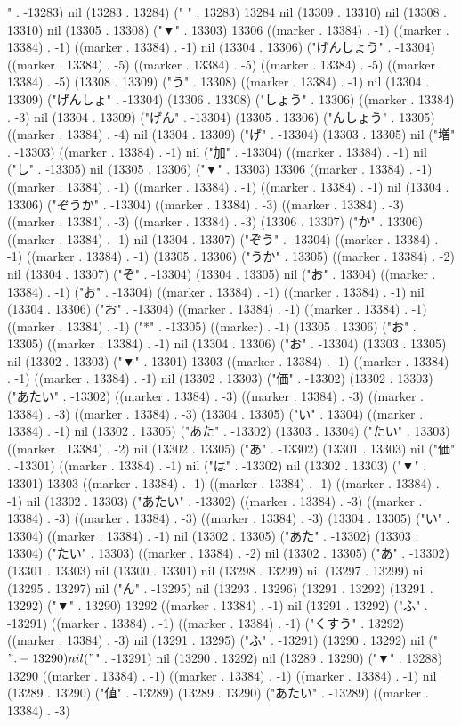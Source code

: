 " . -13283) nil (13283 . 13284) (" " . 13283) 13284 nil (13309 . 13310) nil (13308 . 13310) nil (13305 . 13308) ("▼" . 13303) 13306 ((marker . 13384) . -1) ((marker . 13384) . -1) ((marker . 13384) . -1) nil (13304 . 13306) ("げんしょう" . -13304) ((marker . 13384) . -5) ((marker . 13384) . -5) ((marker . 13384) . -5) ((marker . 13384) . -5) (13308 . 13309) ("う" . 13308) ((marker . 13384) . -1) nil (13304 . 13309) ("げんしょ" . -13304) (13306 . 13308) ("しょう" . 13306) ((marker . 13384) . -3) nil (13304 . 13309) ("げん" . -13304) (13305 . 13306) ("んしょう" . 13305) ((marker . 13384) . -4) nil (13304 . 13309) ("げ" . -13304) (13303 . 13305) nil ("増" . -13303) ((marker . 13384) . -1) nil ("加" . -13304) ((marker . 13384) . -1) nil ("し" . -13305) nil (13305 . 13306) ("▼" . 13303) 13306 ((marker . 13384) . -1) ((marker . 13384) . -1) ((marker . 13384) . -1) ((marker . 13384) . -1) nil (13304 . 13306) ("ぞうか" . -13304) ((marker . 13384) . -3) ((marker . 13384) . -3) ((marker . 13384) . -3) ((marker . 13384) . -3) (13306 . 13307) ("か" . 13306) ((marker . 13384) . -1) nil (13304 . 13307) ("ぞう" . -13304) ((marker . 13384) . -1) ((marker . 13384) . -1) (13305 . 13306) ("うか" . 13305) ((marker . 13384) . -2) nil (13304 . 13307) ("ぞ" . -13304) (13304 . 13305) nil ("お" . 13304) ((marker . 13384) . -1) ("お" . -13304) ((marker . 13384) . -1) ((marker . 13384) . -1) nil (13304 . 13306) ("お" . -13304) ((marker . 13384) . -1) ((marker . 13384) . -1) ((marker . 13384) . -1) ("*" . -13305) ((marker) . -1) (13305 . 13306) ("お" . 13305) ((marker . 13384) . -1) nil (13304 . 13306) ("お" . -13304) (13303 . 13305) nil (13302 . 13303) ("▼" . 13301) 13303 ((marker . 13384) . -1) ((marker . 13384) . -1) ((marker . 13384) . -1) nil (13302 . 13303) ("価" . -13302) (13302 . 13303) ("あたい" . -13302) ((marker . 13384) . -3) ((marker . 13384) . -3) ((marker . 13384) . -3) ((marker . 13384) . -3) (13304 . 13305) ("い" . 13304) ((marker . 13384) . -1) nil (13302 . 13305) ("あた" . -13302) (13303 . 13304) ("たい" . 13303) ((marker . 13384) . -2) nil (13302 . 13305) ("あ" . -13302) (13301 . 13303) nil ("価" . -13301) ((marker . 13384) . -1) nil ("は" . -13302) nil (13302 . 13303) ("▼" . 13301) 13303 ((marker . 13384) . -1) ((marker . 13384) . -1) ((marker . 13384) . -1) nil (13302 . 13303) ("あたい" . -13302) ((marker . 13384) . -3) ((marker . 13384) . -3) ((marker . 13384) . -3) ((marker . 13384) . -3) (13304 . 13305) ("い" . 13304) ((marker . 13384) . -1) nil (13302 . 13305) ("あた" . -13302) (13303 . 13304) ("たい" . 13303) ((marker . 13384) . -2) nil (13302 . 13305) ("あ" . -13302) (13301 . 13303) nil (13300 . 13301) nil (13298 . 13299) nil (13297 . 13299) nil (13295 . 13297) nil ("ん" . -13295) nil (13293 . 13296) (13291 . 13292) (13291 . 13292) ("▼" . 13290) 13292 ((marker . 13384) . -1) nil (13291 . 13292) ("ふ" . -13291) ((marker . 13384) . -1) ((marker . 13384) . -1) ("くすう" . 13292) ((marker . 13384) . -3) nil (13291 . 13295) ("ふ" . -13291) (13290 . 13292) nil ("$" . -13290) nil ("$" . -13291) nil (13290 . 13292) nil (13289 . 13290) ("▼" . 13288) 13290 ((marker . 13384) . -1) ((marker . 13384) . -1) ((marker . 13384) . -1) nil (13289 . 13290) ("値" . -13289) (13289 . 13290) ("あたい" . -13289) ((marker . 13384) . -3) 